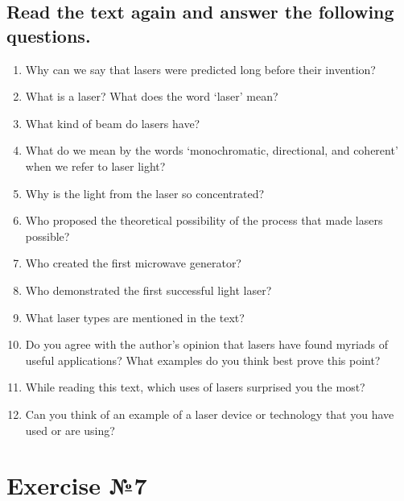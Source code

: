 \subsection*{Read the text again and answer the following questions.}
\begin{enumerate}
      \item Why can we say that lasers were predicted long before their invention?
      \item What is a laser? What does the word ‘laser’ mean?
      \item What kind of beam do lasers have?
      \item What do we mean by the words ‘monochromatic, directional, and coherent’
            when we refer to laser light?
      \item Why is the light from the laser so concentrated?
      \item Who proposed the theoretical possibility of the process that made lasers
            possible?
      \item Who created the first microwave generator?
      \item Who demonstrated the first successful light laser?
      \item What laser types are mentioned in the text?
      \item Do you agree with the author’s opinion that lasers have found myriads
            of useful applications? What examples do you think best prove this point?
      \item While reading this text, which uses of lasers surprised you the most?
      \item Can you think of an example of a laser device or technology that you
            have used or are using?
\end{enumerate}

\section{Exercise №7}
\allocation{[Устно]}

